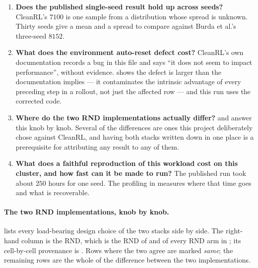\begin{enumerate}[label=\arabic*.,leftmargin=*]
\item \textbf{Does the published single-seed result hold up across seeds?} CleanRL's $7100$ is one
  sample from a distribution whose spread is unknown. Thirty seeds give a mean and a spread to
  compare against Burda et al.'s three-seed $8152$.
\item \textbf{What does the environment auto-reset defect cost?} CleanRL's own documentation records
  a bug in this file and says ``it does not seem to impact performance'', without evidence.
   shows the defect is larger than the documentation implies --- it
  contaminates the intrinsic advantage of every preceding step in a rollout, not just the affected
  row --- and this run uses the corrected code.
\item \textbf{Where do the two RND implementations actually differ?}
   and  answer this knob by knob.
  Several of the differences are ones this project deliberately chose against CleanRL, and having
  both stacks written down in one place is a prerequisite for attributing any result to any of them.
\item \textbf{What does a faithful reproduction of this workload cost on this cluster, and how fast
  can it be made to run?} The published run took about $250$ hours for one seed. The profiling in
   measures where that time goes and what is recoverable.
\end{enumerate}

\paragraph{The two RND implementations, knob by knob.}
 lists every load-bearing design choice of the two stacks side by
side. The right-hand column is the  RND, which is the RND of
 and of every RND arm in ; its cell-by-cell
provenance is . Rows where the two agree are marked \emph{same}; the
remaining rows are the whole of the difference between the two implementations.

